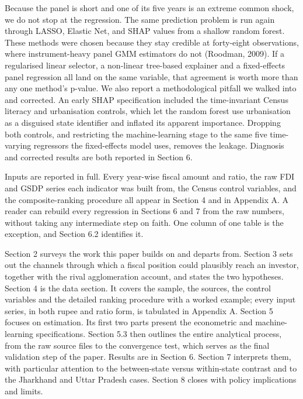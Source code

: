 \documentclass[12pt,a4paper]{article}
\begin{document}
Because the panel is short and one of its five years is an extreme common shock, we do not stop at the regression. The same prediction problem is run again through LASSO, Elastic Net, and SHAP values from a shallow random forest. These methods were chosen because they stay credible at forty-eight observations, where instrument-heavy panel GMM estimators do not (Roodman, 2009). If a regularised linear selector, a non-linear tree-based explainer and a fixed-effects panel regression all land on the same variable, that agreement is worth more than any one method's p-value. We also report a methodological pitfall we walked into and corrected. An early SHAP specification included the time-invariant Census literacy and urbanisation controls, which let the random forest use urbanisation as a disguised state identifier and inflated its apparent importance. Dropping both controls, and restricting the machine-learning stage to the same five time-varying regressors the fixed-effects model uses, removes the leakage. Diagnosis and corrected results are both reported in Section 6.

Inputs are reported in full. Every year-wise fiscal amount and ratio, the raw FDI and GSDP series each indicator was built from, the Census control variables, and the composite-ranking procedure all appear in Section 4 and in Appendix A. A reader can rebuild every regression in Sections 6 and 7 from the raw numbers, without taking any intermediate step on faith. One column of one table is the exception, and Section 6.2 identifies it.

Section 2 surveys the work this paper builds on and departs from. Section 3 sets out the channels through which a fiscal position could plausibly reach an investor, together with the rival agglomeration account, and states the two hypotheses. Section 4 is the data section. It covers the sample, the sources, the control variables and the detailed ranking procedure with a worked example; every input series, in both rupee and ratio form, is tabulated in Appendix A. Section 5 focuses on estimation. Its first two parts present the econometric and machine-learning specifications. Section 5.3 then outlines the entire analytical process, from the raw source files to the convergence test, which serves as the final validation step of the paper. Results are in Section 6. Section 7 interprets them, with particular attention to the between-state versus within-state contrast and to the Jharkhand and Uttar Pradesh cases. Section 8 closes with policy implications and limits.
\end{document}
